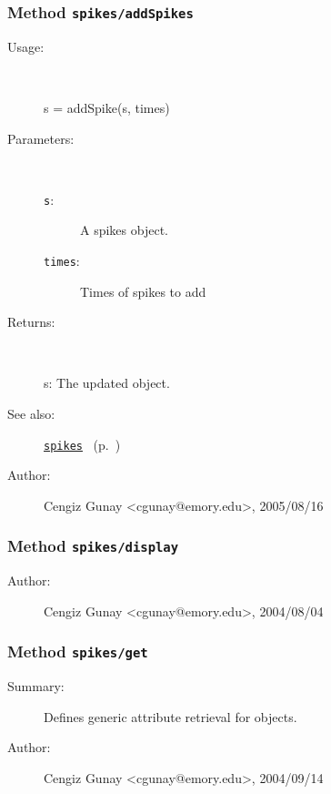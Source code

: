 \subsubsection[Method \texttt{addSpikes}]{Method \texttt{spikes/addSpikes}}%
%
\label{ref_spikes__addSpikes}%
\hypertarget{ref_spikes__addSpikes}{}%
\begin{description}
%
\item[Usage:]~%
\begin{lyxcode}%
s = addSpike(s, times)
%
\end{lyxcode}%
%
%
\item[Parameters:]~
\begin{description}%
\item[\texttt{s}:]
 A spikes object.
\item[\texttt{times}:]
 Times of spikes to add
\end{description}%
%
\item[Returns:
]~

	s: The updated object.
%
%
\item[See also:]%
\hyperlink{ref_spikes}{\texttt{spikes}}%
\ (p.~\pageref{ref_spikes})%
%
%
\item[Author:]%
Cengiz Gunay <cgunay@emory.edu>, 2005/08/16
%
\end{description}
\methodline%
\subsubsection[Method \texttt{display}]{Method \texttt{spikes/display}}%
%
\label{ref_spikes__display}%
\hypertarget{ref_spikes__display}{}%
\begin{description}
%
%
%
%
%
%
%
\item[Author:]%
Cengiz Gunay <cgunay@emory.edu>, 2004/08/04
%
\end{description}
\methodline%
\subsubsection[Method \texttt{get}]{Method \texttt{spikes/get}}%
%
\label{ref_spikes__get}%
\hypertarget{ref_spikes__get}{}%
\begin{description}
\item[Summary:]Defines generic attribute retrieval for objects.
%
%
%
%
%
%
%
\item[Author:]%
Cengiz Gunay <cgunay@emory.edu>, 2004/09/14
%
\end{description}
\methodline%
